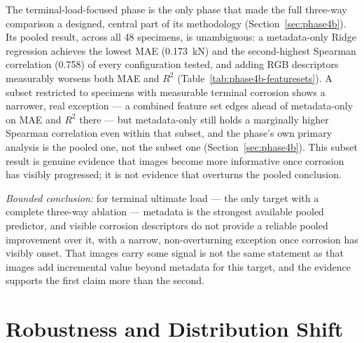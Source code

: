 The terminal-load-focused phase is the only phase that made the full
three-way comparison a designed, central part of its methodology
(Section~\ref{sec:phase4b}). Its pooled result, across all 48 specimens, is
unambiguous: a metadata-only Ridge regression achieves the lowest MAE
(0.173~kN) and the second-highest Spearman correlation (0.758) of every
configuration tested, and adding RGB descriptors measurably worsens both
MAE and $R^2$ (Table~\ref{tab:phase4b-featuresets}). A subset restricted to
specimens with measurable terminal corrosion shows a narrower, real
exception — a combined feature set edges ahead of metadata-only on MAE and
$R^2$ there — but metadata-only still holds a marginally higher Spearman
correlation even within that subset, and the phase's own primary analysis
is the pooled one, not the subset one (Section~\ref{sec:phase4b}). This
subset result is genuine evidence that images become more informative once
corrosion has visibly progressed; it is not evidence that overturns the
pooled conclusion.

\emph{Bounded conclusion:} for terminal ultimate load — the only target
with a complete three-way ablation — metadata is the strongest available
pooled predictor, and visible corrosion descriptors do not provide a
reliable pooled improvement over it, with a narrow, non-overturning
exception once corrosion has visibly onset. That images carry some signal
is not the same statement as that images add incremental value beyond
metadata for this target, and the evidence supports the first claim more
than the second.

\section{Robustness and Distribution Shift}
\label{sec:results-robustness}

